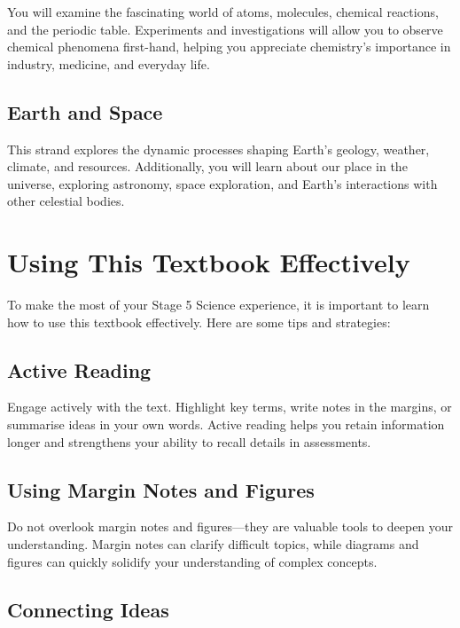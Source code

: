 You will examine the fascinating world of atoms, molecules, chemical reactions, and the periodic table. Experiments and investigations will allow you to observe chemical phenomena first-hand, helping you appreciate chemistry's importance in industry, medicine, and everyday life.

\subsection{Earth and Space}

This strand explores the dynamic processes shaping Earth's geology, weather, climate, and resources. Additionally, you will learn about our place in the universe, exploring astronomy, space exploration, and Earth's interactions with other celestial bodies.

\FloatBarrier

\section{Using This Textbook Effectively}

To make the most of your Stage 5 Science experience, it is important to learn how to use this textbook effectively. Here are some tips and strategies:

\subsection{Active Reading}

Engage actively with the text. Highlight key terms, write notes in the margins, or summarise ideas in your own words. Active reading helps you retain information longer and strengthens your ability to recall details in assessments.


\subsection{Using Margin Notes and Figures}

Do not overlook margin notes and figures—they are valuable tools to deepen your understanding. Margin notes can clarify difficult topics, while diagrams and figures can quickly solidify your understanding of complex concepts.

\subsection{Connecting Ideas}


